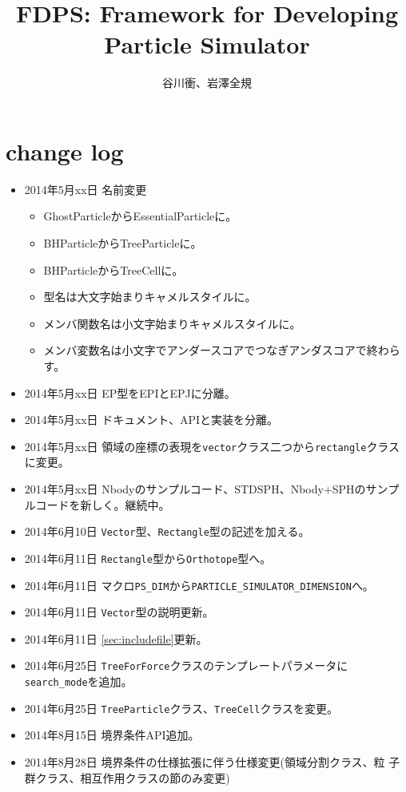 \documentclass[12pt,a4paper]{jarticle}
\title{FDPS: Framework for Developing Particle Simulator}
\author{谷川衝、岩澤全規}
\date{}
\begin{document}
\maketitle
\tableofcontents

\section{change log}
\begin{itemize}
\item 2014年5月xx日 名前変更
\begin{itemize}
\item GhostParticleからEssentialParticleに。
\item BHParticleからTreeParticleに。
\item BHParticleからTreeCellに。
\item 型名は大文字始まりキャメルスタイルに。
\item メンバ関数名は小文字始まりキャメルスタイルに。
\item メンバ変数名は小文字でアンダースコアでつなぎアンダスコアで終わらす。
\end{itemize}
\item 2014年5月xx日 EP型をEPIとEPJに分離。
\item 2014年5月xx日 ドキュメント、APIと実装を分離。
\item 2014年5月xx日 領域の座標の表現を{\tt vector}クラス二つから{\tt rectangle}クラスに変更。
\item 2014年5月xx日 Nbodyのサンプルコード、STDSPH、Nbody+SPHのサンプルコードを新しく。継続中。
\item 2014年6月10日 {\tt Vector}型、{\tt Rectangle}型の記述を加える。
\item 2014年6月11日 {\tt Rectangle}型から{\tt Orthotope}型へ。
\item 2014年6月11日 マクロ{\tt PS\_DIM}から{\tt PARTICLE\_SIMULATOR\_DIMENSION}へ。
\item 2014年6月11日 {\tt Vector}型の説明更新。
\item 2014年6月11日 \ref{sec:includefile}更新。
\item 2014年6月25日 {\tt TreeForForce}クラスのテンプレートパラメータに{\tt search\_mode}を追加。
\item 2014年6月25日 {\tt TreeParticle}クラス、{\tt TreeCell}クラスを変更。
\item 2014年8月15日 境界条件API追加。
\item 2014年8月28日 境界条件の仕様拡張に伴う仕様変更(領域分割クラス、粒
  子群クラス、相互作用クラスの節のみ変更)

\end{itemize}
\end{document}
